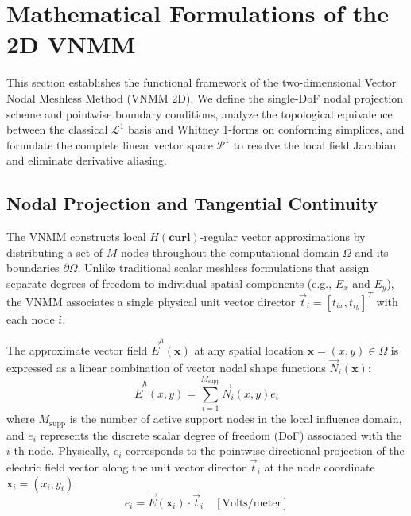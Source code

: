 \documentclass[preprint,12pt]{elsarticle}
\begin{document}
\section{Mathematical Formulations of the 2D VNMM}
\label{sec:formulations}

This section establishes the functional framework of the two-dimensional Vector Nodal Meshless Method (VNMM 2D). We define the single-DoF nodal projection scheme and pointwise boundary conditions, analyze the topological equivalence between the classical $\mathcal{L}^1$ basis and Whitney 1-forms on conforming simplices, and formulate the complete linear vector space $\mathcal{P}^1$ to resolve the local field Jacobian and eliminate derivative aliasing.

\subsection{Nodal Projection and Tangential Continuity}
\label{subsec:nodal_projection}

The VNMM \cite{ortiz2021nodal, ortiz2023tese} constructs local $H(\mathbf{curl})$-regular vector approximations by distributing a set of $M$ nodes throughout the computational domain $\Omega$ and its boundaries $\partial\Omega$. Unlike traditional scalar meshless formulations that assign separate degrees of freedom to individual spatial components (e.g., $E_x$ and $E_y$), the VNMM associates a single physical unit vector director $\vec{t}_i = [t_{ix}, t_{iy}]^T$ with each node $i$.

The approximate vector field $\vec{E}^h(\mathbf{x})$ at any spatial location $\mathbf{x} = (x, y) \in \Omega$ is expressed as a linear combination of vector nodal shape functions $\vec{N}_i(\mathbf{x})$:
\begin{equation}
    \vec{E}^h(x, y) = \sum_{i=1}^{M_{\text{supp}}} \vec{N}_i(x, y) e_i
    \label{eq:field_approx_vnmm}
\end{equation}
where $M_{\text{supp}}$ is the number of active support nodes in the local influence domain, and $e_i$ represents the discrete scalar degree of freedom (DoF) associated with the $i$-th node. Physically, $e_i$ corresponds to the pointwise directional projection of the electric field vector along the unit vector director $\vec{t}_i$ at the node coordinate $\mathbf{x}_i = (x_i, y_i)$:
\begin{equation}
    e_i = \vec{E}(\mathbf{x}_i) \cdot \vec{t}_i \quad [\text{Volts/meter}]
    \label{eq:dof_projection_definition}
\end{equation}
\end{document}
